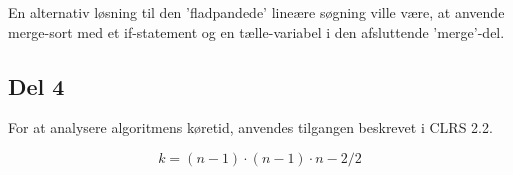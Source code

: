 \documentclass[a4paper,10pt]{article}
\begin{document}
En alternativ løsning til den 'fladpandede' lineære søgning ville være, at anvende merge-sort med et if-statement og en tælle-variabel i den afsluttende 'merge'-del.

\subsection*{Del 4}

For at analysere algoritmens køretid, anvendes tilgangen beskrevet i CLRS 2.2. 

$$
k = (n-1)\cdot{(n-1)\cdot{n-2}/2}
$$
\end{document}
